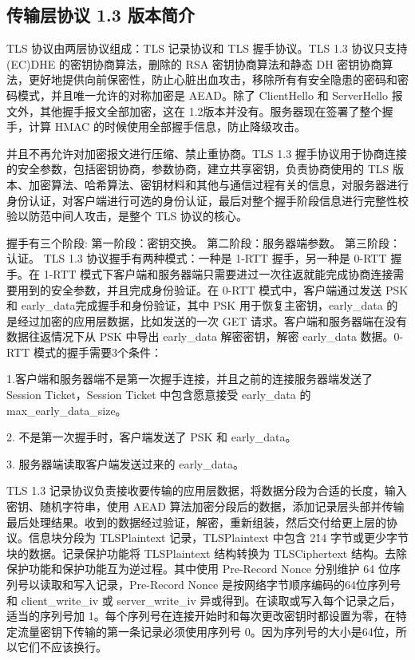 \subsection{传输层协议 1.3 版本简介}

TLS 协议由两层协议组成：TLS 记录协议和 TLS 握手协议。TLS 1.3 协议只支持 (EC)DHE 的密钥协商算法，删除的 RSA 密钥协商算法和静态 DH 密钥协商算法，更好地提供向前保密性，防止心脏出血攻击，移除所有有安全隐患的密码和密码模式，并且唯一允许的对称加密是 AEAD。除了 ClientHello 和 ServerHello 报文外，其他握手报文全部加密，这在 1.2版本并没有。服务器现在签署了整个握手，计算 HMAC 的时候使用全部握手信息，防止降级攻击。

并且不再允许对加密报文进行压缩、禁止重协商。TLS 1.3 握手协议用于协商连接的安全参数，包括密钥协商，参数协商，建立共享密钥，负责协商使用的 TLS 版本、加密算法、哈希算法、密钥材料和其他与通信过程有关的信息，对服务器进行身份认证，对客户端进行可选的身份认证，最后对整个握手阶段信息进行完整性校验以防范中间人攻击，是整个 TLS 协议的核心。

握手有三个阶段: 第一阶段：密钥交换。 第二阶段：服务器端参数。 第三阶段：认证。 TLS 1.3 协议握手有两种模式：一种是 1-RTT 握手，另一种是 0-RTT 握手。在 1-RTT 模式下客户端和服务器端只需要进过一次往返就能完成协商连接需要用到的安全参数，并且完成身份验证。在 0-RTT 模式中，客户端通过发送 PSK 和 early\_data完成握手和身份验证，其中 PSK 用于恢复主密钥，early\_data 的是经过加密的应用层数据，比如发送的一次 GET 请求。客户端和服务器端在没有数据往返情况下从 PSK 中导出 early\_data 解密密钥，解密 early\_data 数据。0-RTT 模式的握手需要3个条件：

1.客户端和服务器端不是第一次握手连接，并且之前的连接服务器端发送了 Session Ticket，Session Ticket 中包含愿意接受 early\_data 的 max\_early\_data\_size。

2. 不是第一次握手时，客户端发送了 PSK 和 early\_data。

3. 服务器端读取客户端发送过来的 early\_data。

TLS 1.3 记录协议负责接收要传输的应用层数据，将数据分段为合适的长度，输入密钥、随机字符串，使用 AEAD 算法加密分段后的数据，添加记录层头部并传输最后处理结果。收到的数据经过验证，解密，重新组装，然后交付给更上层的协议。信息块分段为 TLSPlaintext 记录，TLSPlaintext 中包含 2\^14 字节或更少字节块的数据。记录保护功能将 TLSPlaintext 结构转换为 TLSCiphertext 结构。去除保护功能和保护功能互为逆过程。其中使用 Pre-Record Nonce 分别维护 64 位序列号以读取和写入记录，Pre-Record Nonce 是按网络字节顺序编码的64位序列号和 client\_write\_iv 或 server\_write\_iv 异或得到。在读取或写入每个记录之后，适当的序列号加 1。每个序列号在连接开始时和每次更改密钥时都设置为零，在特定流量密钥下传输的第一条记录必须使用序列号 0。因为序列号的大小是64位，所以它们不应该换行。

